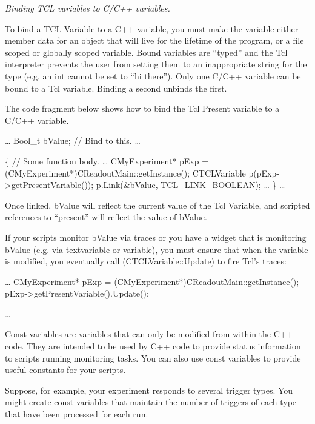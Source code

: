 	 {\em Binding TCL variables to C/C++ variables.}
	 
	 To bind a TCL Variable to a C++ variable, you must
	 make the variable either member data for an object
	 that will  live for the lifetime of the program,
	 or a file scoped or globally scoped variable.
	 Bound variables are ``typed'' and the Tcl interpreter
	 prevents the user from setting them to an inappropriate
	 string for the type (e.g. an int cannot be set to 
	 ``hi there'').  Only one C/C++ variable can be bound
	 to a Tcl variable.   Binding a second unbinds the
	 first.
	 
	 The code fragment below shows how to bind the Tcl
	 Present variable to a C/C++ variable.
	 
	 \begin{example}
	 \ldots
	 Bool_t bValue;         // Bind to this.
	 \ldots
	 
	 \{               // Some function body.
	    \ldots
	    CMyExperiment* pExp = 
	       (CMyExperiment*)CReadoutMain::getInstance();
	    CTCLVariable p(pExp->getPresentVariable());
	    p.Link(&bValue, TCL_LINK_BOOLEAN);
	    \ldots
	 \}
	 \ldots
	 \end{example}
	 
	 Once linked, bValue will reflect the current value 
	 of the Tcl Variable, and scripted references to
	 ``present'' will reflect the value of bValue.
	 
	 If your scripts monitor bValue via traces or you have
	 a widget that is monitoring bValue (e.g. via
	 {\dash}textvariable or {\dash}variable), you must
	 ensure that when the variable is modified, you 
	 eventually call \function(CTCLVariable::Update)
	 to fire Tcl's traces:
	 \begin{example}
	    \ldots
	    CMyExperiment* pExp =
	       (CMyExperiment*)CReadoutMain::getInstance();
	    pExp->getPresentVariable().Update();
	    
	    \ldots
	 \end{example}
	 
	Const variables are variables that can only be modified
	from within the C++ code.  They are intended to be used
	by C++ code to provide status information to scripts running
	monitoring tasks.  You can also use const variables to provide
	useful constants for your scripts.  
	
	Suppose, for example, your experiment responds to several
	trigger types.  You might create const variables that maintain
	the number of triggers of each type that have been processed
	for each run.  
	
